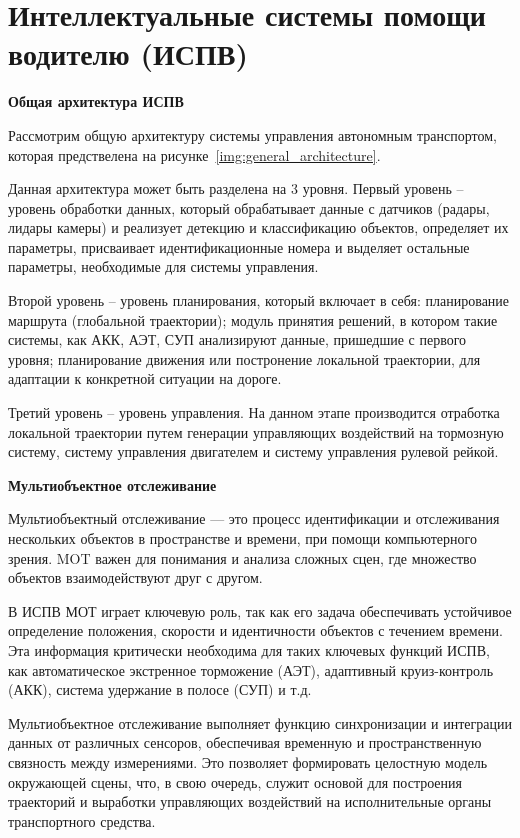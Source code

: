 \section{Интеллектуальные системы помощи водителю (ИСПВ)}

\textbf{Общая архитектура ИСПВ}

Рассмотрим общую архитектуру системы управления автономным транспортом, которая предствелена на рисунке~\ref{img:general_architecture}.


Данная архитектура может быть разделена на 3 уровня. Первый уровень -- уровень обработки данных, который обрабатывает данные с датчиков (радары, лидары камеры) и реализует детекцию и классификацию объектов, определяет их параметры, присваивает идентификационные номера и выделяет остальные параметры, необходимые для системы управления. 

Второй уровень -- уровень планирования, который включает в себя: планирование маршрута (глобальной траектории); модуль принятия решений, в котором такие системы, как АКК, АЭТ, СУП анализируют данные, пришедшие с первого уровня; планирование движения или постронение локальной траектории, для адаптации к конкретной ситуации на дороге. 

Третий уровень -- уровень управления. На данном этапе производится отработка локальной траектории путем генерации управляющих воздействий на тормозную систему, систему управления двигателем и систему управления рулевой рейкой.

\textbf{Мультиобъектное отслеживание}

Мультиобъектный отслеживание — это процесс идентификации и отслеживания нескольких объектов в пространстве и времени, при помощи компьютерного зрения. MOT важен для понимания и анализа сложных сцен, где множество объектов взаимодействуют друг с другом.

В ИСПВ МОТ играет ключевую роль, так как его задача обеспечивать устойчивое определение положения, скорости и идентичности объектов с течением времени. Эта информация критически необходима для таких ключевых функций ИСПВ, как автоматическое экстренное торможение (АЭТ), адаптивный круиз-контроль (АКК), система удержание в полосе (СУП) и т.д.

Мультиобъектное отслеживание выполняет функцию синхронизации и интеграции данных от различных сенсоров, обеспечивая временную и пространственную связность между измерениями. Это позволяет формировать целостную модель окружающей сцены, что, в свою очередь, служит основой для построения траекторий и выработки управляющих воздействий на исполнительные органы транспортного средства.

